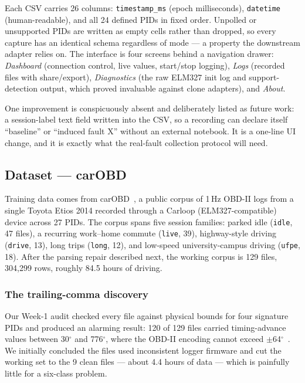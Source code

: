 Each CSV carries 26 columns: \texttt{timestamp\_ms} (epoch milliseconds),
\texttt{datetime} (human-readable), and all 24 defined PIDs in fixed order.
Unpolled or unsupported PIDs are written as empty cells rather than dropped,
so every capture has an identical schema regardless of mode --- a property
the downstream adapter relies on. The interface is four screens behind a
navigation drawer: \emph{Dashboard} (connection control, live values, start/stop
logging), \emph{Logs} (recorded files with share/export), \emph{Diagnostics}
(the raw ELM327 init log and support-detection output, which proved
invaluable against clone adapters), and \emph{About}.

One improvement is conspicuously absent and deliberately listed as future
work: a session-label text field written into the CSV, so a recording can
declare itself ``baseline'' or ``induced fault X'' without an external
notebook. It is a one-line UI change, and it is exactly what the real-fault
collection protocol will need.

\subsection{Dataset --- carOBD}
\label{sec:dataset}

Training data comes from carOBD~\cite{maranhao_carobd}, a public corpus of
1\,Hz OBD-II logs from a single Toyota Etios 2014 recorded through a
Carloop (ELM327-compatible) device across 27 PIDs. The corpus spans five
session families: parked idle (\texttt{idle}, 47 files), a recurring
work--home commute (\texttt{live}, 39), highway-style driving
(\texttt{drive}, 13), long trips (\texttt{long}, 12), and low-speed
university-campus driving (\texttt{ufpe}, 18). After the parsing repair
described next, the working corpus is 129 files, 304{,}299 rows, roughly
84.5 hours of driving.

\subsubsection{The trailing-comma discovery}
\label{sec:trailingcomma}

Our Week-1 audit checked every file against physical bounds for four
signature PIDs and produced an alarming result: 120 of 129 files carried
timing-advance values between 30$^{\circ}$ and 776$^{\circ}$, where the
OBD-II encoding cannot exceed $\pm$64$^{\circ}$~\cite{saej1979}. We
initially concluded the files used inconsistent logger firmware and cut the
working set to the 9 clean files --- about 4.4 hours of data --- which is
painfully little for a six-class problem.

